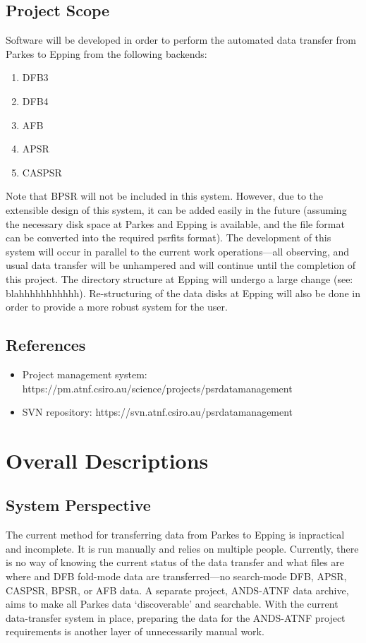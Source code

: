 \documentclass[a4paper,11pt]{article}
\begin{document}
\subsection{Project Scope}
Software will be developed in order to perform the automated data transfer from Parkes to Epping from the following backends:
\begin{enumerate}
\item DFB3
\item DFB4
\item AFB
\item APSR
\item CASPSR
\end{enumerate}

Note that BPSR will not be included in this system. However, due to the extensible design of this system, it can be added easily in the future (assuming the necessary disk space at Parkes and Epping is available, and the file format can be converted into the required psrfits format). The development of this system will occur in parallel to the current work operations---all observing, and usual data transfer will be unhampered and will continue until the completion of this project. The directory structure at Epping will undergo a large change (see: blahhhhhhhhhhh). Re-structuring of the data disks at Epping will also be done in order to provide a more robust system for the user.

\subsection{References}
\begin{itemize}
\item Project management system: https://pm.atnf.csiro.au/science/projects/psrdatamanagement
\item SVN repository: https://svn.atnf.csiro.au/psrdatamanagement
\end{itemize}

\section{Overall Descriptions}
\subsection{System Perspective}
The current method for transferring data from Parkes to Epping is inpractical and incomplete. It is run manually and relies on multiple people. Currently, there is no way of knowing the current status of the data transfer and what files are where and DFB fold-mode data are transferred---no search-mode DFB, APSR, CASPSR, BPSR, or AFB data. A separate project, ANDS-ATNF data archive, aims to make all Parkes data `discoverable' and searchable. With the current data-transfer system in place, preparing the data for the ANDS-ATNF project requirements is another layer of unnecessarily manual work.
\end{document}
